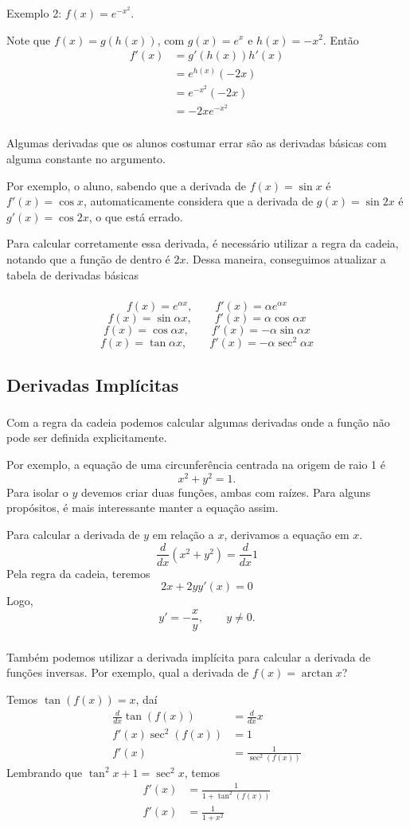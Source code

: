 \documentclass[10 pt]{beamer}
\newcommand{\myframe}[1]{
\begin{frame}
 \frametitle{\insertsection \qquad {\small \insertsubsection}}
#1
\end{frame}}
\begin{document}
\myframe {
  Exemplo 2: $f(x) = e^{-x^2}$.

  Note que $f(x) = g(h(x))$, com
    $g(x) = e^x$ e $h(x) = -x^2$. Então
  \begin{align*}
    f'(x) & = g'(h(x))h'(x) \\
      & = e^{h(x)}(-2x) \\
      & = e^{-x^2}(-2x) \\
      & = -2xe^{-x^2}
  \end{align*}
}

\myframe {
  Algumas derivadas que os alunos costumar errar são as derivadas
  básicas com alguma constante no argumento.
  
  Por exemplo, o aluno, sabendo que a derivada de $f(x) = \sin x$ é
    $f'(x) = \cos x$, automaticamente considera que a derivada
    de $g(x) = \sin 2x$ é $g'(x) = \cos 2x$, o que está errado.

  Para calcular corretamente essa derivada, é necessário utilizar a
  regra da cadeia, notando que a função de dentro é $2x$.
  Dessa maneira, conseguimos atualizar a tabela de derivadas básicas
}

\myframe {
  $$ f(x) = e^{\alpha x}, \qquad f'(x) = \alpha e^{\alpha x} $$
  $$ f(x) = \sin \alpha x, \qquad f'(x) = \alpha \cos \alpha x $$
  $$ f(x) = \cos \alpha x, \qquad f'(x) =  - \alpha \sin \alpha x $$
  $$ f(x) = \tan \alpha x, \qquad f'(x) =  - \alpha \sec^2 \alpha x $$
}

\subsection{Derivadas Implícitas}

\myframe {
  Com a regra da cadeia podemos calcular algumas derivadas onde
  a função não pode ser definida explicitamente.

  Por exemplo, a equação de uma circunferência centrada na origem
  de raio 1 é
    $$ x^2 + y^2 = 1. $$
  Para isolar o $y$ devemos criar duas funções, ambas com raízes.
  Para alguns propósitos, é mais interessante manter a equação
  assim.

  Para calcular a derivada de $y$ em relação a $x$, derivamos
  a equação em $x$.
  $$ \frac{d}{dx}(x^2 + y^2) = \frac{d}{dx}1 $$
  Pela regra da cadeia, teremos
  $$ 2x + 2yy'(x) = 0 $$
  Logo,
  $$ y' = -\frac{x}{y}, \qquad y \neq 0.$$
}

\myframe {
  Também podemos utilizar a derivada implícita para calcular
  a derivada de funções inversas. Por exemplo, qual a derivada
  de $f(x) = \arctan x$?

  Temos $\tan (f(x)) = x$, daí
  \begin{align*}
    \frac{d}{dx}\tan (f(x)) & = \frac{d}{dx} x \\
    f'(x) \sec^2 (f(x)) & = 1  \\
    f'(x) & = \frac{1}{\sec^2 (f(x))}
  \end{align*}
  Lembrando que $\tan^2x + 1 = \sec^2x$, temos
  \begin{align*}
    f'(x) & = \frac{1}{1 + \tan^2(f(x))} \\
    f'(x) & = \frac{1}{1 + x^2}
  \end{align*}
}
\end{document}
